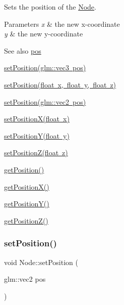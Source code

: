 Sets the position of the \mbox{\hyperlink{classsage_1_1Node}{Node}}. 


\begin{DoxyParams}{Parameters}
{\em x} & the new x-\/coordinate \\
\hline
{\em y} & the new y-\/coordinate \\
\hline
\end{DoxyParams}
\begin{DoxySeeAlso}{See also}
\mbox{\hyperlink{classsage_1_1Node_a26c32e5ec11e0ed7f33053ecac6830d5}{pos}} 

\mbox{\hyperlink{classsage_1_1Node_a12f5d88d221aa5db70c2bd53f6dc049a}{set\+Position(glm\+::vec3 pos)}} 

\mbox{\hyperlink{classsage_1_1Node_ad9899110e543c6b16997512e47c142c9}{set\+Position(float x, float y, float z)}} 

\mbox{\hyperlink{classsage_1_1Node_ae2731cefe38e706c2bf21afae6da18b3}{set\+Position(glm\+::vec2 pos)}} 

\mbox{\hyperlink{classsage_1_1Node_ae1dfc73d6122a95778d5d9db3d1fd913}{set\+Position\+X(float x)}} 

\mbox{\hyperlink{classsage_1_1Node_a5c97d36655f0daa71a5f6c715d2b0470}{set\+Position\+Y(float y)}} 

\mbox{\hyperlink{classsage_1_1Node_a0dd2e816d50418b9b63a78fdf166ba53}{set\+Position\+Z(float z)}} 

\mbox{\hyperlink{classsage_1_1Node_a11fbdf2a2dcdf8bdc014df65f3003925}{get\+Position()}} 

\mbox{\hyperlink{classsage_1_1Node_a17e92da5beaeb4b299c4e93729a22b1a}{get\+Position\+X()}} 

\mbox{\hyperlink{classsage_1_1Node_a26337a40b7da400233451b71e85759cc}{get\+Position\+Y()}} 

\mbox{\hyperlink{classsage_1_1Node_a0c6023aabdeeff9cf981ad81e6aaed9c}{get\+Position\+Z()}} 
\end{DoxySeeAlso}
\mbox{\label{classsage_1_1Node_ae2731cefe38e706c2bf21afae6da18b3}} 
\subsubsection{\texorpdfstring{setPosition()}{setPosition()}\hspace{0.1cm}{\footnotesize\ttfamily [4/4]}}
{\footnotesize\ttfamily void Node\+::set\+Position (\begin{DoxyParamCaption}\item[{glm\+::vec2}]{pos }\end{DoxyParamCaption})}



